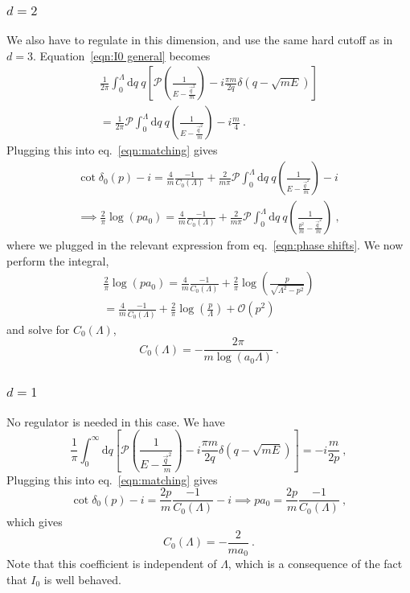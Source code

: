 \documentclass[11pt]{article}
\begin{document}
\subsubsection{$d=2$}
We also have to regulate in this dimension, and use the same hard cutoff as in $d=3$.  Equation~\eqref{eqn:I0 general} becomes
\begin{multline}
\frac{1}{2\pi}\int_0^\Lambda  \mathrm { d } q \ q\left[\mathcal{P} \left( \frac { 1 } { E - \frac{\vec{q}^2}{m} } \right)
-i\frac{\pi m}{2q}\delta(q-\sqrt{mE})\right]\\
=\frac{1}{2\pi}\mathcal{P}\int_0^\Lambda  \mathrm { d } q \ q \left( \frac { 1 } { E - \frac{\vec{q}^2}{m} } \right)
-i\frac{m}{4}\ .
\end{multline}
Plugging this into eq.~\eqref{eqn:matching} gives
\begin{multline}
\cot \delta_0(p)-i=\frac{4}{m}\frac{-1}{C_0(\Lambda)}+\frac{2}{m\pi}\mathcal{P}\int_0^\Lambda  \mathrm { d } q \ q \left( \frac { 1 } { E - \frac{\vec{q}^2}{m} } \right)
-i\\
\implies \frac { 2 } { \pi } \log \left( p a _ { 0 } \right)=\frac{4}{m}\frac{-1}{C_0(\Lambda)}+\frac{2}{m\pi}\mathcal{P}\int_0^\Lambda  \mathrm { d } q \ q \left( \frac { 1 } { \frac{p^2}{m} - \frac{\vec{q}^2}{m} } \right)\ ,
\end{multline}
where we plugged in the relevant expression from eq.~\eqref{eqn:phase shifts}.
We now perform the integral,
\begin{multline}
\frac { 2 } { \pi } \log \left( p a _ { 0 } \right)=\frac{4}{m}\frac{-1}{C_0(\Lambda)}+\frac{2}{\pi } \log \left(\frac{p}{\sqrt{\Lambda ^2-p^2}}\right)\\
=\frac{4}{m}\frac{-1}{C_0(\Lambda)}+\frac{2}{\pi } \log \left(\frac{p}{\Lambda}\right)+\mathcal{O}(p^2)
\end{multline}
and solve for $C_0(\Lambda)$,
\begin{equation}\label{eqn:C 2}
C_0(\Lambda)%
=-\frac{2 \pi }{m \log (a_0\Lambda)}\ .
\end{equation}
   
\subsubsection{$d=1$}
No regulator is needed in this case.  We have
\begin{equation}
\frac{1}{\pi}\int_{0}^{\infty}  \mathrm { d } q \left[\mathcal{P} \left( \frac { 1 } { E - \frac{\vec{q}^2}{m} } \right)
-i\frac{\pi m}{2q}\delta(q-\sqrt{mE})\right]
=-i\frac{m}{2p}\ ,
\end{equation}
Plugging this into eq.~\eqref{eqn:matching} gives
\begin{equation}
\cot \delta_0(p)-i=\frac{2p}{m}\frac{-1}{C_0(\Lambda)}-i
\implies p a_0=\frac{2p}{m}\frac{-1}{C_0(\Lambda)}\ ,
\end{equation}
which gives
\begin{equation}\label{eqn:C 1}
C_0(\Lambda)=-\frac{2}{ma_0}\ .
\end{equation}
Note that this coefficient is independent of $\Lambda$, which is a consequence of the fact that $I_0$ is well behaved.
\end{document}
